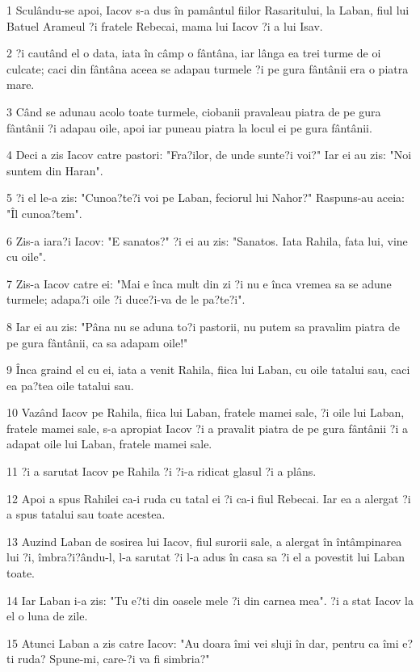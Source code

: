 \par 1 Sculându-se apoi, Iacov s-a dus în pamântul fiilor Rasaritului, la Laban, fiul lui Batuel Arameul ?i fratele Rebecai, mama lui Iacov ?i a lui Isav.
\par 2 ?i cautând el o data, iata în câmp o fântâna, iar lânga ea trei turme de oi culcate; caci din fântâna aceea se adapau turmele ?i pe gura fântânii era o piatra mare.
\par 3 Când se adunau acolo toate turmele, ciobanii pravaleau piatra de pe gura fântânii ?i adapau oile, apoi iar puneau piatra la locul ei pe gura fântânii.
\par 4 Deci a zis Iacov catre pastori: "Fra?ilor, de unde sunte?i voi?" Iar ei au zis: "Noi suntem din Haran".
\par 5 ?i el le-a zis: "Cunoa?te?i voi pe Laban, feciorul lui Nahor?" Raspuns-au aceia: "Îl cunoa?tem".
\par 6 Zis-a iara?i Iacov: "E sanatos?" ?i ei au zis: "Sanatos. Iata Rahila, fata lui, vine cu oile".
\par 7 Zis-a Iacov catre ei: "Mai e înca mult din zi ?i nu e înca vremea sa se adune turmele; adapa?i oile ?i duce?i-va de le pa?te?i".
\par 8 Iar ei au zis: "Pâna nu se aduna to?i pastorii, nu putem sa pravalim piatra de pe gura fântânii, ca sa adapam oile!"
\par 9 Înca graind el cu ei, iata a venit Rahila, fiica lui Laban, cu oile tatalui sau, caci ea pa?tea oile tatalui sau.
\par 10 Vazând Iacov pe Rahila, fiica lui Laban, fratele mamei sale, ?i oile lui Laban, fratele mamei sale, s-a apropiat Iacov ?i a pravalit piatra de pe gura fântânii ?i a adapat oile lui Laban, fratele mamei sale.
\par 11 ?i a sarutat Iacov pe Rahila ?i ?i-a ridicat glasul ?i a plâns.
\par 12 Apoi a spus Rahilei ca-i ruda cu tatal ei ?i ca-i fiul Rebecai. Iar ea a alergat ?i a spus tatalui sau toate acestea.
\par 13 Auzind Laban de sosirea lui Iacov, fiul surorii sale, a alergat în întâmpinarea lui ?i, îmbra?i?ându-l, l-a sarutat ?i l-a adus în casa sa ?i el a povestit lui Laban toate.
\par 14 Iar Laban i-a zis: "Tu e?ti din oasele mele ?i din carnea mea". ?i a stat Iacov la el o luna de zile.
\par 15 Atunci Laban a zis catre Iacov: "Au doara îmi vei sluji în dar, pentru ca îmi e?ti ruda? Spune-mi, care-?i va fi simbria?"
